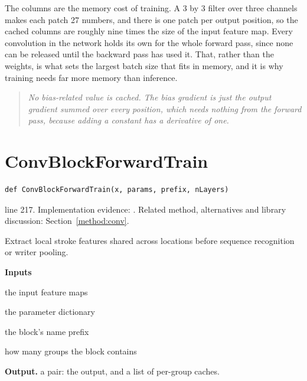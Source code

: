 The columns are the memory cost of training. A 3 by 3 filter over three channels makes each patch 27 numbers, and there is one patch per output position, so the cached columns are roughly nine times the size of the input feature map. Every convolution in the network holds its own for the whole forward pass, since none can be released until the backward pass has used it. That, rather than the weights, is what sets the largest batch size that fits in memory, and it is why training needs far more memory than inference.


\begin{quote}\small\itshape No bias-related value is cached. The bias gradient is just the output gradient summed over every position, which needs nothing from the forward pass, because adding a constant has a derivative of one.\end{quote}


\section{ConvBlockForwardTrain}\label{fn:train:ConvBlockForwardTrain}
\begin{lstlisting}[style=sig]
def ConvBlockForwardTrain(x, params, prefix, nLayers)
\end{lstlisting}
 line 217. Implementation evidence: \cite{code2026}. Related method, alternatives and library discussion: Section~\ref{method:conv}.


Extract local stroke features shared across locations before sequence recognition or writer pooling.




\noindent\textbf{Inputs}
\begin{description}[leftmargin=2.2em,style=nextline,font=\normalfont\ttfamily]\setlength\itemsep{1pt}
  \item[{x}] \normalfont the input feature maps
  \item[{params}] \normalfont the parameter dictionary
  \item[{prefix}] \normalfont the block's name prefix
  \item[{nLayers}] \normalfont how many groups the block contains
\end{description}

\noindent\textbf{Output.} a pair: the output, and a list of per-group caches.


